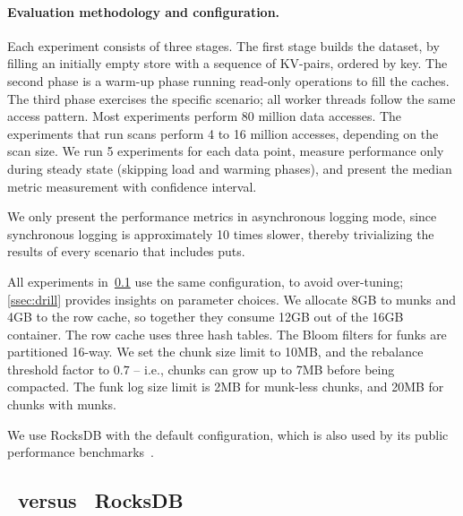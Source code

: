 \paragraph{Evaluation methodology and configuration.} Each experiment consists of three stages. The first stage builds 
the dataset, by filling an initially empty store with a sequence of KV-pairs, ordered by key. The second phase is a warm-up phase running read-only operations to fill the caches. The third
phase exercises the specific scenario; all worker threads follow the same access pattern. Most experiments 
perform 80 million data accesses. The experiments that run scans perform 4 to 16 million accesses, depending 
on the scan size. We run 5 experiments for each data point, measure performance only during steady state (skipping load and warming phases), and present the median metric measurement with confidence interval. 

We only present the performance metrics in asynchronous logging mode, since synchronous logging 
is approximately 10 times slower, thereby trivializing the results of every scenario that includes puts. 

All experiments in~\cref{ssec:results} use the same \sys\/ configuration, to avoid 
over-tuning; \cref{ssec:drill} provides insights on parameter choices.
We allocate 8GB to munks and 4GB to the row cache,
so together they consume 12GB out of the 16GB container. 
The row cache uses three hash tables.  
The Bloom filters for funks are partitioned 16-way.  
We set the \sys\/ chunk size limit to 10MB, and the rebalance threshold factor to $0.7$ -- i.e., 
chunks can grow up to 7MB  %
before being compacted. The funk log size limit is 2MB for munk-less chunks, 
and 20MB for chunks with munks. 

We use RocksDB with the default configuration, which is also used by its public performance benchmarks~\cite{RocksDBPerf}.

\subsection{\sys\ versus \ RocksDB}
\label{ssec:results} 

